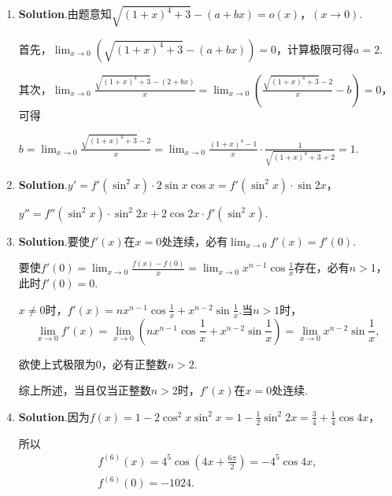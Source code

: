\documentclass[../Main.tex]{subfiles}
\begin{document}
\begin{enumerate}
          当$x=0$时，$f(0)=\frac{1}{2}$；

          当$x>0$时，$\lim_{n\to\infty}\mathrm{e}^{-nx}=0$，$f(x)=\lim_{n\to\infty}\frac{x+\mathrm{e}^{nx}}{1+\mathrm{e}^{nx}}
              =\lim_{n\to\infty}\frac{x\mathrm{e}^{-nx}+1}{\mathrm{e}^{-nx}+1}=1.$

          因此$f(x)=
              \begin{cases}
                  1,           & x>0, \\
                  \frac{1}{2}, & x=0, \\
                  x,           & x<0
              \end{cases}$，在区间$(-\infty,0)\cup(0,+\infty)$连续.

          因$f(0^{-})=0$，$f(0^{+})=1$，故$x=0$是$f(x)$的跳跃间断点.

    \item \textbf{Solution}.由题意知$\sqrt{(1+x)^{4}+3}-(a+bx)=o(x)$，$(x\to0)$.

          首先，$\lim_{x\to0}\left(\sqrt{(1+x)^{4}+3}-(a+bx)\right)=0$，计算极限可得$a
              =2$.

          其次，$\lim_{x\to0}\frac{\sqrt{(1+x)^4+3}-(2+bx)}{x}=\lim_{x\to0}\left(\frac{\sqrt{(1+x)^{4}+3}-2}{x}
              -b\right)=0$，可得

          $b=\lim_{x\to0}\frac{\sqrt{(1+x)^{4}+3}-2}{x}=\lim_{x\to0}\frac{(1+x)^{4}-1}{x}
              \cdot\frac{1}{\sqrt{(1+x)^{4}+3}+2}=1.$

    \item \textbf{Solution}.$y'=f'(\sin^{2} x)\cdot2\sin x\cos x=f'(\sin^{2} x)\cdot
              \sin 2x$，

          $y''=f''(\sin^{2} x)\cdot\sin^{2} 2x+2\cos 2x\cdot f'(\sin^{2} x)$.

    \item \textbf{Solution}.要使$f'(x)$在$x=0$处连续，必有$\lim_{x\to0}f'(x)=f'(0
              ).$

          要使$f'(0)=\lim_{x\to0}\frac{f(x)-f(0)}{x}=\lim_{x\to0}x^{n-1}\cos\frac{1}{x}$存在，必有$n
              >1$，此时$f'(0)=0$.

          $x\neq0$时，$f'(x)=nx^{n-1}\cos\frac{1}{x}+x^{n-2}\sin\frac{1}{x}$.当$n>1$时，
          \[
              \lim_{x\to0}f'(x)=\lim_{x\to0}\left(nx^{n-1}\cos\frac{1}{x}+x^{n-2}\sin\frac{1}{x}
              \right)=\lim_{x\to0}x^{n-2}\sin\frac{1}{x},
          \]

          欲使上式极限为0，必有正整数$n>2$.

          综上所述，当且仅当正整数$n>2$时，$f'(x)$在$x=0$处连续.

    \item \textbf{Solution}.因为$f(x)=1-2\cos^{2} x\sin^{2} x=1-\frac{1}{2}\sin^{2}
              2x=\frac{3}{4}+\frac{1}{4}\cos 4x$，

          所以
          \[
              \begin{gathered}
                  f^{(6)}(x)=4^5\cos\left(4x+\frac{6\pi}{2}\right)=-4^5\cos 4x,\\
                  f^{(6)}(0)=-1024.
              \end{gathered}
          \]
\end{enumerate}
\end{document}
